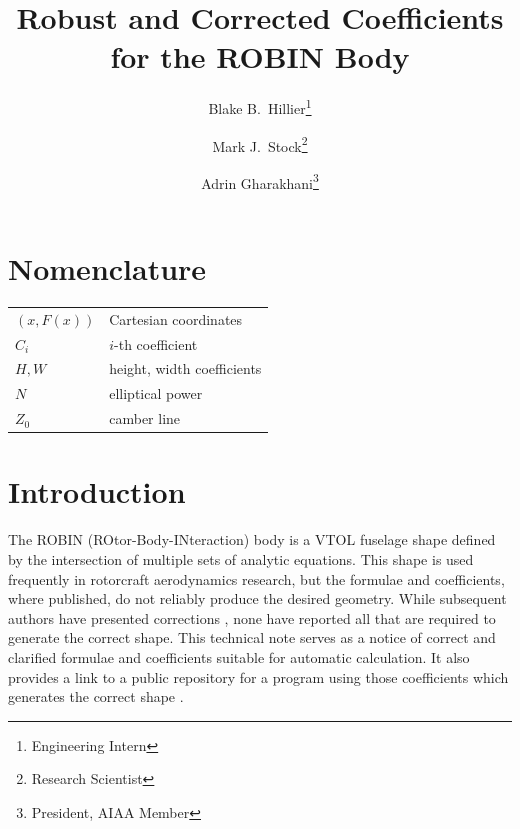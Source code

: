 \documentclass[journal]{new-aiaa}
\title{Robust and Corrected Coefficients for the ROBIN Body}
\author{Blake B.~Hillier\footnote{Engineering Intern}}
\author{Mark J.~Stock\footnote{Research Scientist}}
\author{Adrin Gharakhani\footnote{President, AIAA Member}}
\affil{Applied Scientific Research, Inc.\\ Irvine, CA}
\begin{document}
\maketitle


\section*{Nomenclature}

{\renewcommand\arraystretch{1.0}
\noindent\begin{longtable*}{@{}l @{\quad=\quad} l@{}}
$(x, F(x))$  & Cartesian coordinates \\
$C_{i}$ &    $i$-th coefficient \\
$H,W$ &    height, width coefficients \\
$N$ &    elliptical power \\
$Z_{0}$ &    camber line \\
\end{longtable*}}


\section{Introduction}
The ROBIN (ROtor-Body-INteraction) body is a VTOL fuselage shape \cite{nasa87762,mineckgorton,nasa80051,nasa1999}
defined by the intersection of multiple sets of analytic equations.
This shape is used frequently in rotorcraft aerodynamics research, but the formulae and
coefficients, where published, do not reliably produce the desired geometry.
While subsequent authors have presented corrections \cite{nasa87762,mineckgorton},
none have reported all that are required to generate the correct shape.
This technical note serves as a notice of correct and clarified formulae and coefficients
suitable for automatic calculation. It also provides a link to a public repository
for a program using those coefficients which generates the correct shape \cite{robinsurfmesh}.

\end{document}
